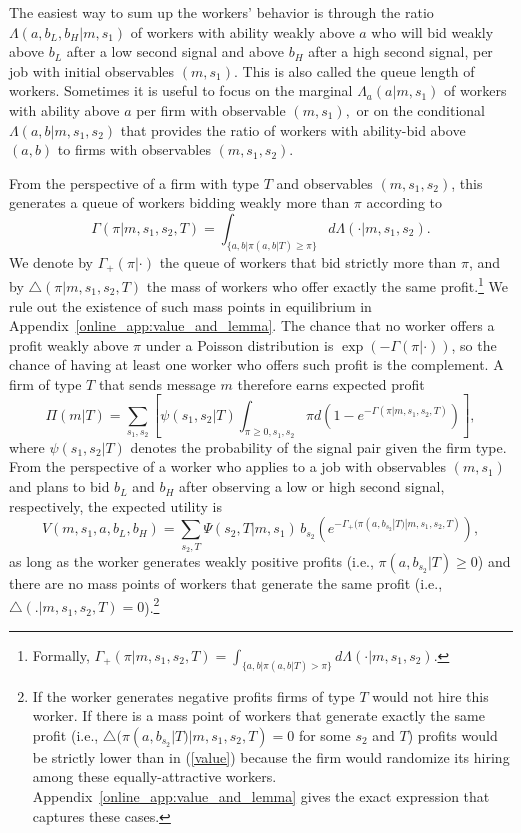 \documentclass[12pt]{article}
\begin{document}
The easiest way to sum up the workers' behavior is through the ratio $\Lambda(a,b_{L},b_{H}|m,s_{1})$ of workers with ability weakly above $a$ who will bid weakly above $b_{L}$ after a low second signal and above $b_{H}$ after a high second signal, per job with initial observables $(m,s_{1})$. This is also called the queue length of workers. Sometimes it is useful to focus on the marginal $\Lambda_{a}(a|m,s_{1})$ of workers with ability above $a$ per firm with observable $(m,s_{1}),$ or on the conditional $\Lambda(a,b|m,s_{1},s_{2})$ that provides the ratio of workers with ability-bid above $(a,b)$ to firms with observables $(m,s_{1},s_{2}).$

From the perspective of a firm with type $T$ and observables $(m,s_{1},s_{2})$, this generates a queue of workers bidding weakly more than $\pi$ according to
\begin{equation*}
\Gamma(\pi|m,s_{1},s_{2},T)=\int_{\{a,b|\pi(a,b|T)\geq\pi\}}d\Lambda(\cdot|m,s_{1},s_{2}).
\end{equation*}%
We denote by $\Gamma_{+}(\pi|\cdot)$ the queue of workers that bid strictly more than $\pi$, and by $\bigtriangleup(\pi|m,s_{1},s_{2},T)$ the mass of workers who offer exactly the same profit.\footnote{Formally, $\Gamma_{+}(\pi|m,s_{1},s_{2},T)=\int_{\{a,b|\pi(a,b|T)>\pi\}}d\Lambda(\cdot|m,s_{1},s_{2})$.} We rule out the existence of such mass points in equilibrium in Appendix~\ref{online_app:value_and_lemma}. The chance that no worker offers a profit weakly above $\pi$ under a Poisson distribution is $\exp(-\Gamma(\pi|\cdot))$, so the chance of having at least one worker who offers such profit is the complement. A firm of type $T$ that sends message $m$ therefore earns expected profit
\begin{equation}
\Pi (m|T)=\sum_{s_{1},s_{2}}\left[ \psi (s_{1},s_{2}|T)\int_{\pi \geq 
0,s_{1},s_{2}}\pi d(1-e^{-\Gamma (\pi |m,s_{1},s_{2},T)})\right] ,
\label{profits}
\end{equation}%
where $\psi(s_{1},s_{2}|T)$ denotes the probability of the signal pair given the firm type. 
From the perspective of a worker who applies to a job with observables $(m,s_1)$
and plans to bid $b_L$ and $b_H$ after observing a low or high second signal,
respectively, the expected utility is
\begin{equation}
V(m,s_{1},a,b_{L},b_{H})=\sum_{s_{2},T}\Psi(s_{2},T|m,s_{1})\,b_{s_{2}} \left(
  e^{-\Gamma_{+}(\pi(a,b_{s_{2}}|T)|m,s_{1},s_{2},T)} \right),
\label{value}
\end{equation}
as long as the worker generates weakly positive profits (i.e., $\pi (a,b_{s_2}|T)\geq 0$) and there are no mass points of workers that generate the same profit (i.e., $\bigtriangleup (.|m,s_{1},s_{2},T)=0$).\footnote{
If the worker generates negative profits firms of type $T$ would not hire this worker. If there is a mass point of workers that generate exactly the same profit (i.e., $\bigtriangleup (\pi
(a,b_{s_2}|T)|m,s_{1},s_{2},T)=0$ for some $s_2$ and $T$) profits would be strictly lower than in (\ref{value}) because the firm would randomize its hiring among these equally-attractive workers. Appendix~\ref{online_app:value_and_lemma} gives the exact expression that captures these cases.}
\end{document}

